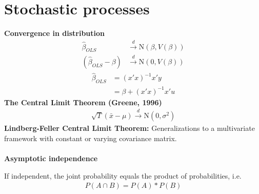 \section{Stochastic processes}
\begin{multicols}{2} \noindent
  \textbf{Convergence in distribution}
  \begin{align*}
   \hat{\beta}_{OLS}         & \xrightarrow{d} \textrm{N}(\beta,V(\beta)) \\
   (\hat{\beta}_{OLS}-\beta) & \xrightarrow{d} \textrm{N}(0,V(\beta))
  \end{align*}
  \begin{align*}
   \hat{\beta}_{OLS} & = (x'x)^{-1}x'y         \\
                     & = \beta + (x'x)^{-1}x'u
  \end{align*}\noindent
\textbf{The Central Limit Theorem (Greene, 1996)}
\begin{align*}
  \sqrt{T}(\bar{x}-\mu)\xrightarrow{d}\textrm{N}(0,\sigma^2)
\end{align*}
 \textbf{Lindberg-Feller Central Limit Theorem:} Generalizations to a multivariate framework with constant or varying covariance matrix.
\\ \\
 \textbf{Asymptotic independence}\par
 If independent, the joint probability equals the product of probabilities, i.e.
 \begin{align*}
  P(A\cap B) = P(A)*P(B)
 \end{align*}
\end{multicols}


